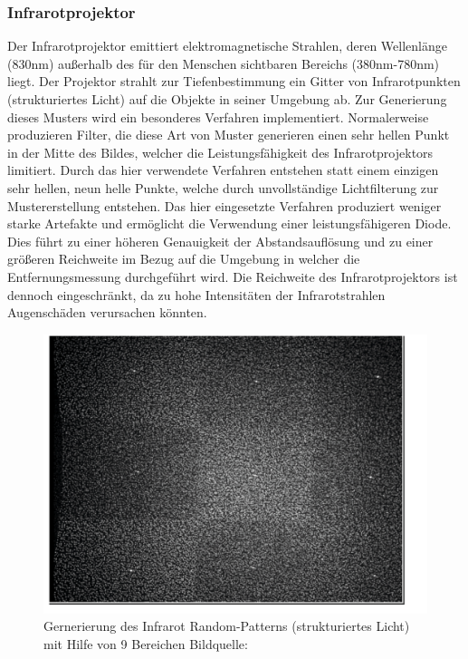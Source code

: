 \subsubsection{Infrarotprojektor}
Der Infrarotprojektor emittiert elektromagnetische Strahlen, deren Wellenlänge (830nm) außerhalb des für den Menschen sichtbaren Bereichs (380nm-780nm) liegt\cite{borenstein2012making}.
Der Projektor strahlt zur Tiefenbestimmung ein Gitter von Infrarotpunkten (strukturiertes Licht) auf die Objekte in seiner Umgebung ab. 
Zur Generierung dieses Musters wird ein besonderes Verfahren implementiert.
Normalerweise produzieren Filter, die diese Art von Muster generieren einen sehr hellen Punkt in der Mitte des Bildes, welcher die Leistungsfähigkeit des Infrarotprojektors limitiert. Durch das hier verwendete Verfahren entstehen statt einem einzigen sehr hellen, neun helle Punkte, welche durch unvollständige Lichtfilterung zur Mustererstellung entstehen\cite{Kramer}. Das hier eingesetzte Verfahren produziert weniger starke Artefakte und ermöglicht die Verwendung einer leistungsfähigeren Diode. Dies führt zu einer höheren Genauigkeit der Abstandsauflösung und zu einer größeren Reichweite im Bezug auf die Umgebung in welcher die Entfernungsmessung durchgeführt wird. Die Reichweite des Infrarotprojektors ist dennoch eingeschränkt, da zu hohe Intensitäten der Infrarotstrahlen Augenschäden verursachen könnten.
\begin{figure}
\centering
\includegraphics[width=0.5\linewidth]{./Res/9_Dots}
\caption{Gernerierung des Infrarot Random-Patterns (strukturiertes Licht) mit Hilfe von 9 Bereichen Bildquelle:\cite{Kramer}}
\label{fig:9_Dots}
\end{figure}
\FloatBarrier


